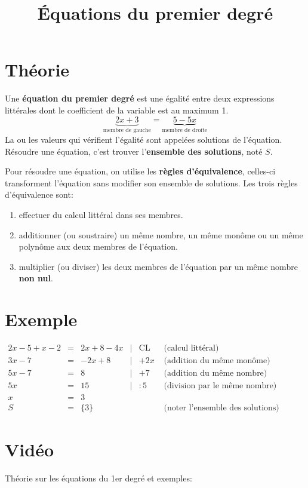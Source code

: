 \documentclass[a4paper,11pt]{article}
\begin{document}
\title{Équations du premier degré}
\date{}
\maketitle

\section{Théorie}
Une \textbf{équation du premier degré} est une égalité entre deux expressions littérales dont le coefficient de la variable est au maximum 1.
$$\underbrace{2x + 3}_{\text{membre de gauche}} = \underbrace{5 - 5x}_{\text{membre de droite}}$$
La ou les valeurs qui vérifient l'égalité sont appelées solutions de l'équation. Résoudre une équation, c'est trouver l'\textbf{ensemble des solutions}, noté $S$.

Pour résoudre une équation, on utilise les \textbf{règles d'équivalence}, celles-ci transforment l'équation sans modifier son ensemble de solutions. Les trois règles d'équivalence sont:
\begin{enumerate}[label*=\arabic*.]
\item effectuer du calcul littéral dans ses membres.
\item additionner (ou soustraire) un même nombre, un même monôme ou un même polynôme aux deux membres de l'équation.
\item multiplier (ou diviser) les deux membres de l'équation par un même nombre \textbf{non nul}.
\end{enumerate}

\section{Exemple}
$\begin{array}{rclrll}
2x-5+x-2 &=&2x+8-4x &|& \text{CL} & \text{ (calcul littéral)} \\
3x-7 &=&-2x+8 &|& +2x & \text{ (addition du même monôme)} \\
5x-7 &=& 8 &|& +7 &  \text{ (addition du même nombre)}\\
5x &=& 15 &|& :5 & \text{ (division par le même nombre)}\\
x &=& 3 &&&\\
S &=& \{3\} &&& \text{ (noter l'ensemble des solutions)}
\end{array}$

\section{Vidéo}
Théorie sur les équations du 1er degré et exemples:\par
{} %
\end{document}
